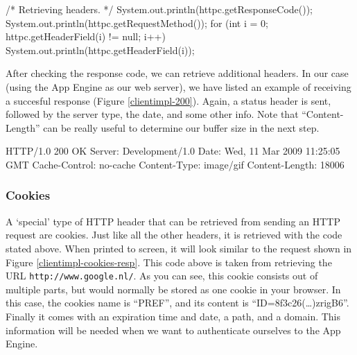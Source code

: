 \begin{figure*}[ht] %
\begin{center}
\begin{code}
/* Retrieving headers. */
System.out.println(httpc.getResponseCode());
System.out.println(httpc.getRequestMethod());
for (int i = 0; httpc.getHeaderField(i) != null; i++) {
    System.out.println(httpc.getHeaderField(i));
}
\end{code}
\caption{Retrieving HTTP response headers.\label{clientimpl-headers}}
\end{center}
\end{figure*}

After checking the response code, we can retrieve additional headers. In our case
(using the App Engine as our web server), we have listed an example of receiving
a succesful response (Figure \ref{clientimpl-200}). Again, a status header is
sent, followed by the server type, the date, and some other info. Note that
``Content-Length'' can be really useful to determine our buffer size in the next
step.

\begin{figure*}[ht] %
\begin{center}
\begin{code}
HTTP/1.0 200 OK
Server: Development/1.0
Date: Wed, 11 Mar 2009 11:25:05 GMT
Cache-Control: no-cache
Content-Type: image/gif
Content-Length: 18006
\end{code}
\caption{Example of HTTP response headers.\label{clientimpl-200}}
\end{center}
\end{figure*}

\subsubsection{Cookies}
\label{clientimpl-cookies}
A `special' type of HTTP header that can be retrieved from sending an HTTP
request are cookies. Just like all the other headers, it is retrieved with the
code stated above. When printed to screen, it will look similar to the request
shown in Figure \ref{clientimpl-cookies-resp}. This code above is taken from
retrieving the URL \texttt{http://www.google.nl/}. As you can see, this cookie
consists out of multiple parts, but would normally be stored as one cookie in your
browser. In this case, the cookies name is ``PREF'', and its content is
``ID=8f3c26(\ldots)zrigB6''. Finally it comes with an expiration time and date,
a path, and a domain. This information will be needed when we want to authenticate
ourselves to the App Engine.

